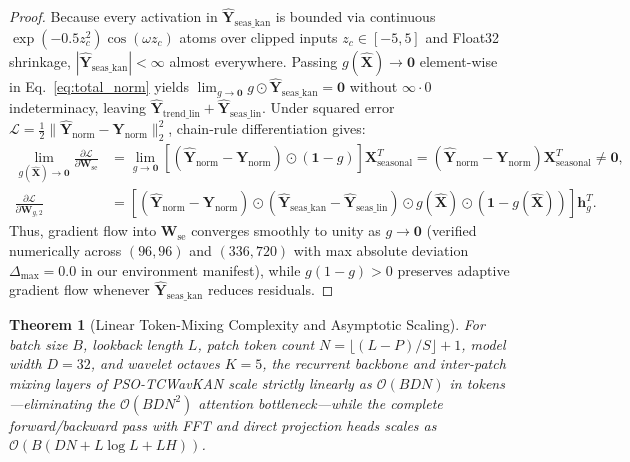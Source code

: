 \documentclass[pdflatex,sn-mathphys-num,referee,lineno]{sn-jnl}
\theoremstyle{thmstyleone}
\newtheorem{theorem}{Theorem}[section]
\theoremstyle{thmstyletwo}
\theoremstyle{thmstylethree}
\begin{document}
\begin{proof}
Because every activation in $\hat{\mathbf{Y}}_{\mathrm{seas\_kan}}$ is bounded via continuous $\exp(-0.5 z_c^2) \cos(\omega z_c)$ atoms over clipped inputs $z_c \in [-5, 5]$ and Float32 shrinkage, $|\hat{\mathbf{Y}}_{\mathrm{seas\_kan}}| < \infty$ almost everywhere. Passing $g(\hat{\mathbf{X}}) \to \mathbf{0}$ element-wise in Eq.~\eqref{eq:total_norm} yields $\lim_{g \to \mathbf{0}} g \odot \hat{\mathbf{Y}}_{\mathrm{seas\_kan}} = \mathbf{0}$ without $\infty \cdot 0$ indeterminacy, leaving $\hat{\mathbf{Y}}_{\mathrm{trend\_lin}} + \hat{\mathbf{Y}}_{\mathrm{seas\_lin}}$. Under squared error $\mathcal{L} = \frac{1}{2}\|\hat{\mathbf{Y}}_{\mathrm{norm}} - \mathbf{Y}_{\mathrm{norm}}\|_2^2$, chain-rule differentiation gives:
\begin{align}
\lim_{g(\hat{\mathbf{X}}) \to \mathbf{0}} \frac{\partial \mathcal{L}}{\partial \mathbf{W}_{\mathrm{se}}} &= \lim_{g \to \mathbf{0}} \left[(\hat{\mathbf{Y}}_{\mathrm{norm}} - \mathbf{Y}_{\mathrm{norm}}) \odot (\mathbf{1} - g)\right] \mathbf{X}_{\mathrm{seasonal}}^T = (\hat{\mathbf{Y}}_{\mathrm{norm}} - \mathbf{Y}_{\mathrm{norm}}) \mathbf{X}_{\mathrm{seasonal}}^T \neq \mathbf{0}, \label{eq:prop1_grad_w} \\
\frac{\partial \mathcal{L}}{\partial \mathbf{W}_{g,2}} &= \left[(\hat{\mathbf{Y}}_{\mathrm{norm}} - \mathbf{Y}_{\mathrm{norm}}) \odot (\hat{\mathbf{Y}}_{\mathrm{seas\_kan}} - \hat{\mathbf{Y}}_{\mathrm{seas\_lin}}) \odot g(\hat{\mathbf{X}}) \odot (\mathbf{1} - g(\hat{\mathbf{X}}))\right] \mathbf{h}_g^T. \label{eq:prop1_grad_gate}
\end{align}
Thus, gradient flow into $\mathbf{W}_{\mathrm{se}}$ converges smoothly to unity as $g \to \mathbf{0}$ (verified numerically across $(96,96)$ and $(336,720)$ with max absolute deviation $\Delta_{\max} = 0.0$ in our environment manifest), while $g(1-g) > 0$ preserves adaptive gradient flow whenever $\hat{\mathbf{Y}}_{\mathrm{seas\_kan}}$ reduces residuals.
\end{proof}

\begin{theorem}[Linear Token-Mixing Complexity and Asymptotic Scaling]
\label{thm:linear_complexity}
For batch size $B$, lookback length $L$, patch token count $N = \lfloor(L - P)/S\rfloor + 1$, model width $D=32$, and wavelet octaves $K=5$, the recurrent backbone and inter-patch mixing layers of PSO-TCWavKAN scale strictly linearly as $\mathcal{O}(B D N)$ in tokens---eliminating the $\mathcal{O}(B D N^2)$ attention bottleneck---while the complete forward/backward pass with FFT and direct projection heads scales as $\mathcal{O}(B(D N + L \log L + L H))$.
\end{theorem}
\end{document}
